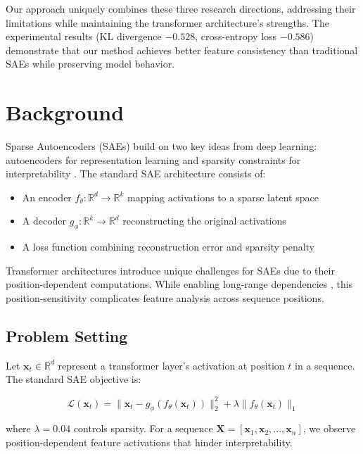 \documentclass{article} %
\begin{document}
Our approach uniquely combines these three research directions, addressing their limitations while maintaining the transformer architecture's strengths. The experimental results (KL divergence $-0.528$, cross-entropy loss $-0.586$) demonstrate that our method achieves better feature consistency than traditional SAEs while preserving model behavior.

\section{Background}
\label{sec:background}

Sparse Autoencoders (SAEs) build on two key ideas from deep learning: autoencoders for representation learning \cite{goodfellow2016deep} and sparsity constraints for interpretability \cite{vaswani2017attention}. The standard SAE architecture consists of:

\begin{itemize}
    \item An encoder $f_\theta: \mathbb{R}^d \rightarrow \mathbb{R}^k$ mapping activations to a sparse latent space
    \item A decoder $g_\phi: \mathbb{R}^k \rightarrow \mathbb{R}^d$ reconstructing the original activations
    \item A loss function combining reconstruction error and sparsity penalty
\end{itemize}

Transformer architectures \cite{vaswani2017attention} introduce unique challenges for SAEs due to their position-dependent computations. While enabling long-range dependencies \cite{radford2019language}, this position-sensitivity complicates feature analysis across sequence positions.

\subsection{Problem Setting}
Let $\mathbf{x}_t \in \mathbb{R}^d$ represent a transformer layer's activation at position $t$ in a sequence. The standard SAE objective is:

\begin{equation}
    \mathcal{L}(\mathbf{x}_t) = \|\mathbf{x}_t - g_\phi(f_\theta(\mathbf{x}_t))\|_2^2 + \lambda \|f_\theta(\mathbf{x}_t)\|_1
\end{equation}

where $\lambda=0.04$ controls sparsity. For a sequence $\mathbf{X} = [\mathbf{x}_1, \mathbf{x}_2, ..., \mathbf{x}_n]$, we observe position-dependent feature activations that hinder interpretability.
\end{document}
